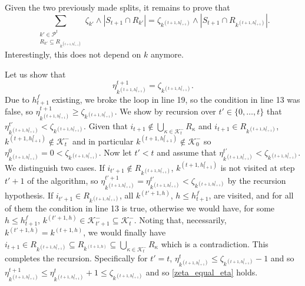 \documentclass[
  11pt,
  a4paper,
]{article}
\theoremstyle{definition}
\theoremstyle{plain}
\theoremstyle{plain}
\theoremstyle{plain}
\theoremstyle{definition}
\theoremstyle{remark}
\begin{document}
Given the two previously made splits, it remains to prove that
\begin{equation*}
\sum_{\substack{k'\in\mathcal{P}^{t}\\R_{k'}\subseteq  R_{  k^{(t+1,h^f_{t+1})}} }} \zeta_{k'}\wedge |S_{t+1}\cap R_{k'}| =  \zeta_{ k^{(t+1,h^f_{t+1})}}\wedge |S_{t+1}\cap R_{ k^{(t+1,h^f_{t+1})}}|.
\end{equation*} Interestingly, this does not depend on \(k\) anymore.

Let us show that \begin{equation}
\eta^{t+1}_{k^{(t+1,h^f_{t+1})} }= \zeta_{ k^{(t+1,h^f_{t+1})}}.
\label{zeta_equal_eta}
\end{equation} Due to \(h^f_{t+1}\) existing, we broke the loop in line
19, so the condition in line 13 was false, so
\(\eta^{t+1}_{k^{(t+1,h^f_{t+1})} }\geq \zeta_{ k^{(t+1,h^f_{t+1})}}\).
We show by recursion over \(t'\in\{0,\dotsc,t\}\) that
\(\eta^{t'}_{k^{(t+1,h^f_{t+1})} }< \zeta_{ k^{(t+1,h^f_{t+1})}}\).
Given that
\(i_{t+1}\not\in\bigcup_{\kappa\in\mathcal{K}^-_{t}}R_{\kappa}\) and
\(i_{t+1}\in R_{k^{(t+1,h^f_{t+1})}}\),
\(k^{(t+1,h^f_{t+1})} \not\in \mathcal{K}^-_{t}\) and in particular
\(k^{(t+1,h^f_{t+1})} \not\in \mathcal{K}^-_{0}\) so
\(\eta^{0}_{k^{(t+1,h^f_{t+1})} }=0< \zeta_{ k^{(t+1,h^f_{t+1})}}\). Now
let \(t'<t\) and assume that
\(\eta^{t'}_{k^{(t+1,h^f_{t+1})} }< \zeta_{ k^{(t+1,h^f_{t+1})}}\). We
distinguish two cases. If \(i_{t'+1}\not\in R_{k^{(t+1,h^f_{t+1})}}\),
\(k^{(t+1,h^f_{t+1})}\) is not visited at step \(t'+1\) of the
algorithm, so
\(\eta^{t'+1}_{k^{(t+1,h^f_{t+1})} }=\eta^{t'}_{k^{(t+1,h^f_{t+1})} }< \zeta_{ k^{(t+1,h^f_{t+1})}}\)
by the recursion hypothesis. If \(i_{t'+1}\in R_{k^{(t+1,h^f_{t+1})}}\),
all \(k^{(t'+1,h)}\), \(h\leq h^f_{t+1}\), are visited, and for all of
them the condition in line 13 is true, otherwise we would have, for some
\(h\leq h^f_{t+1}\),
\(k^{(t'+1,h)}\in\mathcal{K}^-_{t'+1}\subseteq\mathcal{K}^-_{t}\).
Noting that, necessarily, \(k^{(t'+1,h)}=k^{(t+1,h)}\), we would finally
have
\(i_{t+1}\in R_{k^{(t+1,h^f_{t+1})}}\subseteq R_{k^{(t+1,h)}}\subseteq \bigcup_{\kappa\in\mathcal{K}^-_{t}}R_{\kappa}\)
which is a contradiction. This completes the recursion. Specifically for
\(t'=t\),
\(\eta^{t}_{k^{(t+1,h^f_{t+1})} }\leq \zeta_{ k^{(t+1,h^f_{t+1})}}-1\)
and so
\(\eta^{t+1}_{k^{(t+1,h^f_{t+1})} }\leq\eta^{t}_{k^{(t+1,h^f_{t+1})} }+1\leq \zeta_{ k^{(t+1,h^f_{t+1})}}\)
and so \eqref{zeta_equal_eta} holds.
\end{document}

